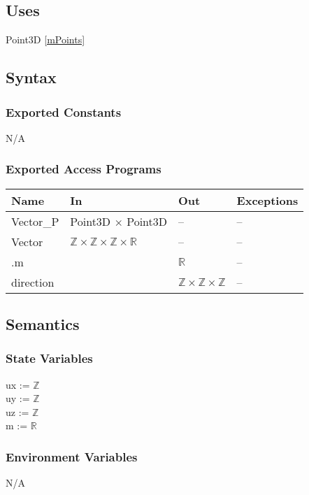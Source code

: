 \documentclass[12pt, titlepage]{article}
\begin{document}
\subsection{Uses}
Point3D \ref{mPoints}

\subsection{Syntax}
\subsubsection{Exported Constants}
N/A
\subsubsection{Exported Access Programs}
\begin{center}
	\begin{tabular}{p{4cm} p{2cm} p{2cm} p{4cm}}
		\hline
		\textbf{Name} & \textbf{In} & \textbf{Out} & \textbf{Exceptions} \\
		\hline
		Vector\_P & Point3D $\times$ Point3D & -- & -- \\
		Vector & $ \mathbb{Z} \times \mathbb{Z} \times \mathbb{Z} \times 
		\mathbb{R} $ & -- & -- \\
		.m & & $\mathbb{R}$ & -- \\
		direction & & $ \mathbb{Z} \times \mathbb{Z} \times \mathbb{Z}$  & -- 
		\\	
		\hline
	\end{tabular}
\end{center}

\subsection{Semantics}
\subsubsection{State Variables}
ux := $\mathbb{Z}$ \\
uy := $\mathbb{Z}$ \\
uz := $\mathbb{Z}$ \\
m := $\mathbb{R}$ \\ 

\subsubsection{Environment Variables}
N/A
\end{document}
